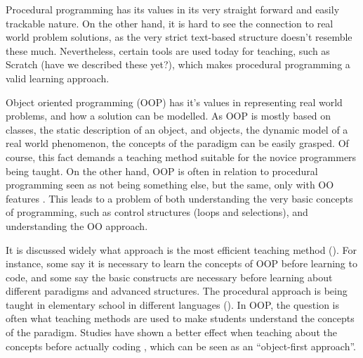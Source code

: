 Procedural programming has its values in its very straight forward and easily trackable nature. On the other hand, it is hard to see the connection to real world problem solutions, as the very strict text-based structure doesn't resemble these much. Nevertheless, certain tools are used today for teaching, such as Scratch (have we described these yet?), which makes procedural programming a valid learning approach.

Object oriented programming (OOP) has it's values in representing real world problems, and how a solution can be modelled. As OOP is mostly based on classes, the static description of an object, and objects, the dynamic model of a real world phenomenon, the concepts of the paradigm can be easily grasped. Of course, this fact demands a teaching method suitable for the novice programmers being taught. On the other hand, OOP is often in relation to procedural programming seen as not being something else, but the same, only with OO features \cite{Garner05}. This leads to a problem of both understanding the very basic concepts of programming, such as control structures (loops and selections), and understanding the OO approach.

It is discussed widely what approach is the most efficient teaching method (). For instance, some say it is necessary to learn the concepts of OOP before learning to code, and some say the basic constructs are necessary before learning about different paradigms and advanced structures. The procedural approach is being taught in elementary school in different languages (). In OOP, the question is often what teaching methods are used to make students understand the concepts of the paradigm. Studies have shown a better effect when teaching about the concepts before actually coding \cite{Xinogalos15}, which can be seen as an ``object-first approach''.



